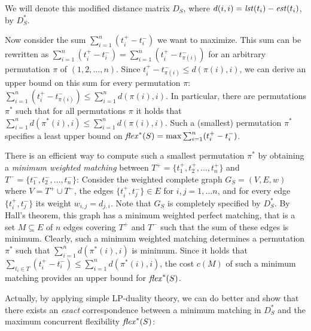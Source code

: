We will denote this modified distance matrix $D_S$, where $d(i,i) = \mathit{lst}(t_i)-\mathit{est}(t_i)$, by $D^*_S$.

Now consider the sum
$\sum^n_{i=1} (t^{+}_i - t^-_i) $
we want to maximize.
This sum can be rewritten as
$\sum^n_{i=1} (t^{+}_i - t^-_i)  = \sum^n_{i=1} (t^+_i - t^-_{\pi(i)})
$
for an arbitrary permutation $\pi$ of $(1,2, \ldots, n)$.
Since $t^+_i -  t^-_{\pi(i)} \leq d(\pi(i),i)$, we can derive an upper bound on this sum for every permutation $\pi$:
$  \sum^n_{i=1} (t^+_i - t^-_{\pi(i)}) \leq \sum^n_{i=1} d(\pi(i),i)$.
In particular, there are permutations $\pi^*$ such that for all permutations $\pi$ it holds that
$  \sum^n_{i=1} d(\pi^*(i),i) \leq \sum^n_{i=1} d(\pi(i),i) $.
Such a (smallest) permutation $\pi^*$ specifies a least upper bound on $\mathit{flex}^*(S) = \max  \sum^n_{i=1} (t^{+}_i - t^-_i)$.

There is an efficient  way to compute such a smallest permutation $\pi^*$ by obtaining a \emph{minimum weighted matching} between $T^+ = \{t^+_1, t^+_2, \ldots, t^+_n\}$ and $T^- = \{t^-_1, t^-_2, \ldots, t^-_n\}$:
Consider the weighted complete graph $G_S = (V, E, w)$ where $V = T^+ \cup T^-$, the edges $\{t^+_i, t^-_j \} \in E$ for $i, j =1,\dots n$, and for every edge $\{t^+_i, t^-_j\}$ its weight $w_{i,j} = d_{j,i}$. Note that $G_S$ is completely specified by $D^*_S$.
By Hall's theorem, this graph has a minimum weighted perfect matching, that is a set $M \subseteq E$ of $n$ edges covering $T^+$ and $T^-$ such that the sum of these edges is minimum.
Clearly,  such a minimum weighted matching determines a permutation $\pi^*$ such that  $\sum^n_{i=1} d(\pi^*(i),i)$ is minimum.
Since it holds that $ \sum_{t_i \in T}(t^+_i - t^-_i) \leq \sum^n_{i=1} d(\pi^*(i),i)$,
the cost $c(M)$ of such a minimum matching provides an upper bound for $\mathit{flex}^*(S)$.

Actually, by applying simple LP-duality theory, we can do  better and show that there exists an \emph{exact} correspondence between a minimum matching in $D^*_S$ and the maximum concurrent flexibility $\mathit{flex}^*(S)$:

